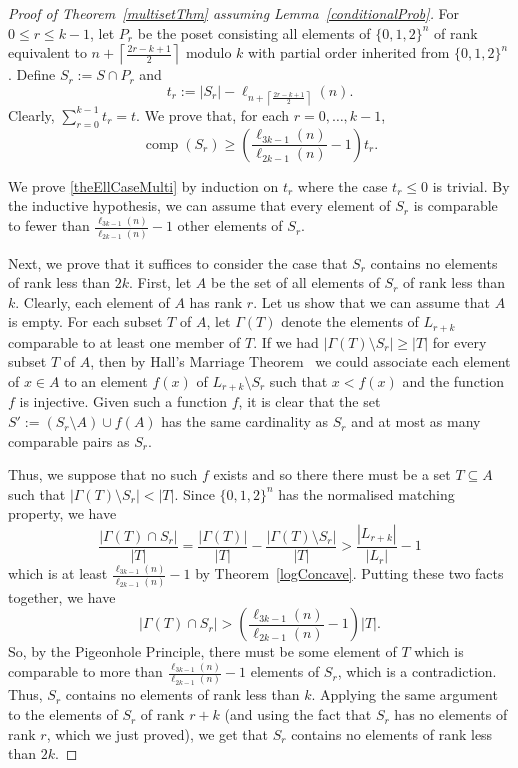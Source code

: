 \documentclass[11 pt]{article}
\theoremstyle{definition}
\theoremstyle{case}
\numberwithin{equation}{section}
\DeclareMathOperator{\comp}{comp}
\begin{document}
\begin{proof}[Proof of Theorem~\ref{multisetThm} assuming Lemma~\ref{conditionalProb}]
For $0\leq r\leq k-1$, let $P_r$ be the poset consisting all elements of $\{0,1,2\}^n$ of rank equivalent to $n+\left\lceil\frac{2r-k+1}{2}\right\rceil$ modulo $k$ with partial order inherited from $\{0,1,2\}^n$. Define $S_r:=S\cap P_{r}$ and
\[t_r:=|S_r| - \ell_{n+\left\lceil\frac{2r-k+1}{2}\right\rceil}(n).\] 
Clearly, $\sum_{r=0}^{k-1}t_r = t$. We prove that, for each $r=0,\dots,k-1$,
\begin{equation}\label{theEllCaseMulti}\comp(S_r)\geq \left(\frac{\ell_{3k-1}(n)}{\ell_{2k-1}(n)} - 1\right)t_r.\end{equation} 

We prove \eqref{theEllCaseMulti} by induction on $t_r$ where the case $t_r\leq 0$ is trivial. By the inductive hypothesis, we can assume that every element of $S_r$ is comparable to fewer than $\frac{\ell_{3k-1}(n)}{\ell_{2k-1}(n)} - 1$ other elements of $S_r$. 

Next, we prove that it suffices to consider the case that $S_r$ contains no elements of rank less than $2k$. First, let $A$ be the set of all elements of $S_r$ of rank less than $k$. Clearly, each element of $A$ has rank $r$. Let us show that we can assume that $A$ is empty. For each subset $T$ of $A$, let $\Gamma(T)$ denote the elements of $L_{r+k}$ comparable to at least one member of $T$. If we had $|\Gamma(T)\setminus S_{r}|\geq |T|$ for every subset $T$ of $A$, then by Hall's Marriage Theorem~\cite{Hall} we could associate each element of $x\in A$ to an element $f(x)$ of $L_{r+k}\setminus S_{r}$ such that $x<f(x)$ and the function $f$ is injective. Given such a function $f$, it is clear that the set $S':=\left(S_r\setminus A\right)\cup f(A)$ has the same cardinality as $S_r$ and at most as many comparable pairs as $S_r$. 

Thus, we suppose that no such $f$ exists and so there there must be a set $T\subseteq A$ such that $|\Gamma(T)\setminus S_{r}| < |T|$. Since $\{0,1,2\}^n$ has the normalised matching property, we have
\[\frac{|\Gamma(T)\cap S_r|}{|T|} =\frac{|\Gamma(T)|}{|T|}- \frac{|\Gamma(T)\setminus S_r|}{|T|} > \frac{|L_{r+k}|}{|L_r|} -1\]
which is at least $\frac{\ell_{3k-1}(n)}{\ell_{2k-1}(n)}-1$ by Theorem~\ref{logConcave}. Putting these two facts together, we have
\begin{equation}\label{gammaT}|\Gamma(T)\cap S_r| > \left(\frac{\ell_{3k-1}(n)}{\ell_{2k-1}(n)}-1\right)|T|.\end{equation}
So, by the Pigeonhole Principle, there must be some element of $T$ which is comparable to more than $\frac{\ell_{3k-1}(n)}{\ell_{2k-1}(n)}-1$ elements of $S_r$, which is a contradiction. Thus, $S_r$ contains no elements of rank less than $k$. Applying the same argument to the elements of $S_r$ of rank $r+k$ (and using the fact that $S_r$ has no elements of rank $r$, which we just proved), we get that $S_r$ contains no elements of rank less than $2k$. 



\end{proof}
\end{document}
